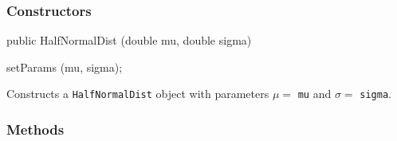 \subsubsection* {Constructors}

\begin{code}

   public HalfNormalDist (double mu, double sigma)\begin{hide} {
      setParams (mu, sigma);
   }\end{hide}
\end{code}
  \begin{tabb}  Constructs a \texttt{HalfNormalDist} object with parameters $\mu =$
     \texttt{mu} and $\sigma =$ \texttt{sigma}.
  \end{tabb}

\subsubsection* {Methods}

